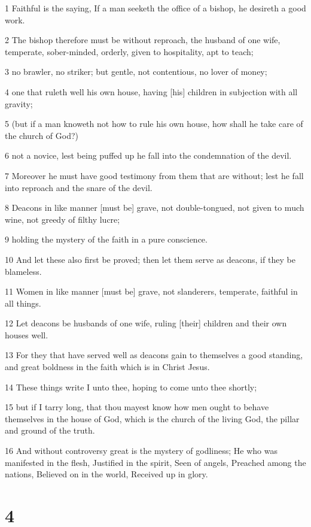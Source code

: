 \par 1 Faithful is the saying, If a man seeketh the office of a bishop, he desireth a good work.
\par 2 The bishop therefore must be without reproach, the husband of one wife, temperate, sober-minded, orderly, given to hospitality, apt to teach;
\par 3 no brawler, no striker; but gentle, not contentious, no lover of money;
\par 4 one that ruleth well his own house, having [his] children in subjection with all gravity;
\par 5 (but if a man knoweth not how to rule his own house, how shall he take care of the church of God?)
\par 6 not a novice, lest being puffed up he fall into the condemnation of the devil.
\par 7 Moreover he must have good testimony from them that are without; lest he fall into reproach and the snare of the devil.
\par 8 Deacons in like manner [must be] grave, not double-tongued, not given to much wine, not greedy of filthy lucre;
\par 9 holding the mystery of the faith in a pure conscience.
\par 10 And let these also first be proved; then let them serve as deacons, if they be blameless.
\par 11 Women in like manner [must be] grave, not slanderers, temperate, faithful in all things.
\par 12 Let deacons be husbands of one wife, ruling [their] children and their own houses well.
\par 13 For they that have served well as deacons gain to themselves a good standing, and great boldness in the faith which is in Christ Jesus.
\par 14 These things write I unto thee, hoping to come unto thee shortly;
\par 15 but if I tarry long, that thou mayest know how men ought to behave themselves in the house of God, which is the church of the living God, the pillar and ground of the truth.
\par 16 And without controversy great is the mystery of godliness; He who was manifested in the flesh, Justified in the spirit, Seen of angels, Preached among the nations, Believed on in the world, Received up in glory.

\chapter{4}

